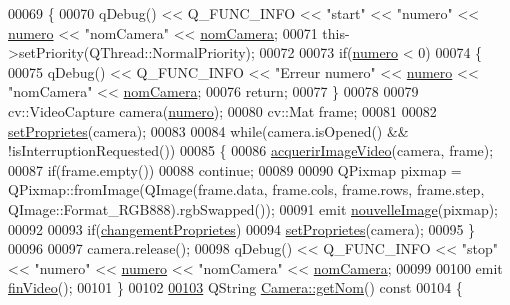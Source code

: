 \begin{DoxyCode}
00069 \{
00070     qDebug() << Q\_FUNC\_INFO << \textcolor{stringliteral}{"start"} << \textcolor{stringliteral}{"numero"} << \hyperlink{class_camera_ae5cda5df3c9c49b88fff15389a1bbc64}{numero} << \textcolor{stringliteral}{"nomCamera"} << 
      \hyperlink{class_camera_ac1cdaf82921d2a2f3f941d867718eba2}{nomCamera};
00071     this->setPriority(QThread::NormalPriority);
00072 
00073     \textcolor{keywordflow}{if}(\hyperlink{class_camera_ae5cda5df3c9c49b88fff15389a1bbc64}{numero} < 0)
00074     \{
00075         qDebug() << Q\_FUNC\_INFO  << \textcolor{stringliteral}{"Erreur numero"} << \hyperlink{class_camera_ae5cda5df3c9c49b88fff15389a1bbc64}{numero} << \textcolor{stringliteral}{"nomCamera"} << 
      \hyperlink{class_camera_ac1cdaf82921d2a2f3f941d867718eba2}{nomCamera};
00076         \textcolor{keywordflow}{return};
00077     \}
00078 
00079     cv::VideoCapture camera(\hyperlink{class_camera_ae5cda5df3c9c49b88fff15389a1bbc64}{numero});
00080     cv::Mat frame;
00081 
00082     \hyperlink{class_camera_a77397d68d606172ccfafed5624c31213}{setProprietes}(camera);
00083 
00084     \textcolor{keywordflow}{while}(camera.isOpened() && !isInterruptionRequested())
00085     \{
00086         \hyperlink{class_camera_afbddcda62053404cbf06a4ba48c62732}{acquerirImageVideo}(camera, frame);
00087         \textcolor{keywordflow}{if}(frame.empty())
00088             \textcolor{keywordflow}{continue};
00089 
00090         QPixmap pixmap = QPixmap::fromImage(QImage(frame.data, frame.cols, frame.rows, frame.step, 
      QImage::Format\_RGB888).rgbSwapped());
00091         emit \hyperlink{class_camera_a38c810d466375e950401e483f885c52f}{nouvelleImage}(pixmap);
00092 
00093         \textcolor{keywordflow}{if}(\hyperlink{class_camera_a50d2b3ef5c08f8b61bbe2115d71005bd}{changementProprietes})
00094             \hyperlink{class_camera_a77397d68d606172ccfafed5624c31213}{setProprietes}(camera);
00095     \}
00096 
00097     camera.release();
00098     qDebug() << Q\_FUNC\_INFO << \textcolor{stringliteral}{"stop"} << \textcolor{stringliteral}{"numero"} << \hyperlink{class_camera_ae5cda5df3c9c49b88fff15389a1bbc64}{numero} << \textcolor{stringliteral}{"nomCamera"} << 
      \hyperlink{class_camera_ac1cdaf82921d2a2f3f941d867718eba2}{nomCamera};
00099 
00100     emit \hyperlink{class_camera_a4c560c4add60ebce65e2d9717e3d668c}{finVideo}();
00101 \}
00102 
\hyperlink{class_camera_a9b27a8a444006f40548a9a4ecf4d7256}{00103} QString \hyperlink{class_camera_a9b27a8a444006f40548a9a4ecf4d7256}{Camera::getNom}()\textcolor{keyword}{ const}
00104 \textcolor{keyword}{}\{

\end{DoxyCode}
